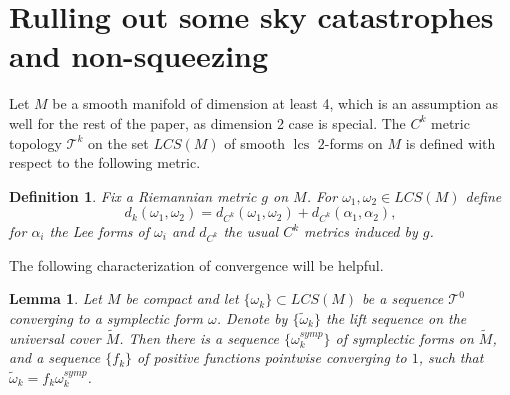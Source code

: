 \documentclass{amsart}
\numberwithin{equation}{section}
\newtheorem{lemma}[equation]{Lemma}
\newtheorem{definition}[equation]{Definition}
\theoremstyle{definition}
\theoremstyle{remark}
\DeclareMathOperator{\lcs}{lcs}
\begin{document}
\section {Rulling out some sky catastrophes and non-squeezing} \label{section:basics} %
Let $M$ be a smooth manifold of dimension at least 4, which is an assumption as well for the rest of the paper, as dimension 2 case is special.  The $C ^{k} $ metric topology $\mathcal{T} ^{k} $ on the set $LCS (M)$ of smooth $\lcs$ $2$-forms on $M$ is defined with respect to the following metric. 
\begin{definition} \label{def:norm} Fix a Riemannian metric $g$ on $M$. For $\omega _{1}, \omega _{2} \in LCS (M)  $ define
\begin{equation*}
d _{k}  (\omega _{1}, \omega _{2}  )= d _{C ^{k}}  (\omega _{1}, \omega _{2} ) + d _{C ^{k} } (\alpha _{1}, \alpha _{2}),
\end{equation*}
for $\alpha _{i} $ the Lee forms of $\omega _{i} $ and $d _{C ^{k} } $ the 
usual $C ^{k} $ metrics induced by $g$.
\end{definition}  
The following characterization of convergence will be helpful.
\begin{lemma} \label{lemma:lcsconvergence}
Let $M$ be compact and let $\{\omega _{k}\} \subset LCS (M)  $ be a sequence $\mathcal{T} ^{0} $ converging to a symplectic form $\omega$. Denote by $\{\widetilde{\omega} _{k}  \}$ the lift sequence on the universal cover $\widetilde{M} $.
   Then there is a sequence $\{\omega _{k} ^{symp}\}  $ of symplectic forms on $\widetilde{M} $, and a sequence  $\{f _{k}\}  $ of positive functions pointwise converging to $1$, such that $ \widetilde{\omega} _{k} =  f _{k} \omega _{k} ^{symp}   $.
\end{lemma}
\end{document}
